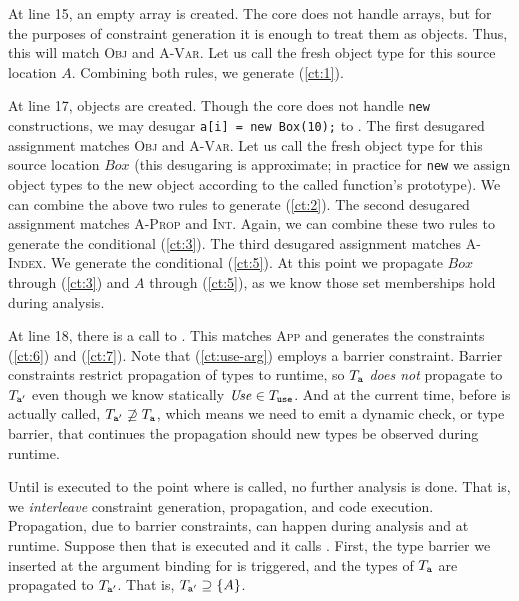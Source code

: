 At line 15, an empty array is created. The core does not handle arrays, but
for the purposes of constraint generation it is enough to treat them as
objects. Thus, this will match \textsc{Obj} and \textsc{A-Var}. Let us call
the fresh object type for this source location $A$. Combining both rules,
we generate (\ref{ct:1}).

At line 17,  objects are created. Though the core does not handle
\lstinline{new} constructions, we may desugar
\lstinline{a[i] = new Box(10);} to . The first desugared assignment matches \textsc{Obj} and
\textsc{A-Var}. Let us call the fresh object type for this source location
$\mathit{Box}$ (this desugaring is approximate; in practice for \lstinline{new} we assign
object types to the new object according to the called function's prototype).
We can combine the above two rules to generate (\ref{ct:2}).
The second desugared assignment matches \textsc{A-Prop} and
\textsc{Int}. Again, we can combine these two rules to generate the
conditional (\ref{ct:3}).  The third desugared assignment matches
\textsc{A-Index}. We generate the conditional (\ref{ct:5}). At this point we
propagate $\mathit{Box}$ through (\ref{ct:3}) and $\mathit{A}$
through (\ref{ct:5}), as we know those set memberships hold during analysis.

At line 18, there is a call to . This matches \textsc{App} and
generates the constraints (\ref{ct:6}) and (\ref{ct:7}). Note that
(\ref{ct:use-arg}) employs a barrier constraint. Barrier constraints
restrict propagation of types to runtime, so $T_{\texttt{a}}$
\emph{does not} propagate to $T_{\texttt{a}'}$ even though we know statically
$\mathit{Use} \in T_{\texttt{use}}$. And at the current time, before 
is actually called, $T_{\texttt{a}'} \not\supseteq T_{\texttt{a}}$, which means we
need to emit a dynamic check, or type barrier, that continues the propagation
should new types be observed during runtime.

Until  is executed to the point where  is called, no
further analysis is done. That is, we \emph{interleave} constraint generation,
propagation, and code execution. Propagation, due to barrier constraints, can
happen during analysis and at runtime.
Suppose then that  is executed and it calls . First,
the type barrier we inserted at the argument binding for  is
triggered, and the types of $T_{\texttt{a}}$ are propagated to
$T_{\texttt{a}'}$. That is, $T_{\texttt{a}'} \supseteq \{A\}$.

